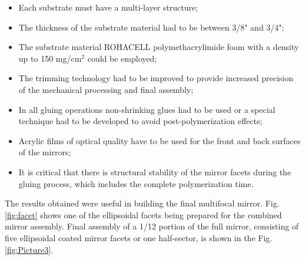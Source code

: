 \begin{itemize}
    \item Each substrate must have a multi-layer structure;
    \item The thickness of the substrate material had to be between 3/8" and 3/4";
    \item The substrate material ROHACELL polymethacrylimide foam with a density up to 150 mg/cm$^2$ could be employed;
    \item The trimming technology had to be improved to provide increased precision of the mechanical processing and final assembly;
    \item In all gluing operations non-shrinking glues had to be used or a special technique had to be developed to avoid post-polymerization effects;
    \item Acrylic films of optical quality have to be used for the front and back surfaces of the mirrors;
    \item It is critical that there is structural stability of the mirror facets during the gluing process, which includes the complete polymerization time.
    \end{itemize}

The results obtained were useful in building the final multifocal mirror. Fig. \ref{fig:facet} shows one of the ellipsoidal facets being prepared for the combined mirror assembly. Final assembly of a 1/12 portion of the full mirror, consisting of five ellipsoidal coated mirror facets or one half-sector, is shown in the Fig. \ref{fig:Picture3}.


